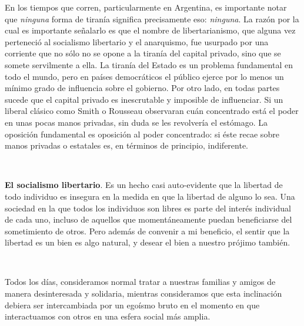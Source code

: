 \documentclass[a4paper, 12pt]{article}
\begin{document}
En los tiempos que corren, particularmente en Argentina, es importante notar que
\textit{ninguna} forma de tiranía significa precisamente eso: \textit{ninguna}.
La razón por la cual es importante señalarlo es que el nombre de
libertarianismo, que alguna vez perteneció al socialismo libertario y el
anarquismo, fue usurpado por una corriente que no sólo no se opone a la tiranía
del capital privado, sino que se somete servilmente a ella. La tiranía del
Estado es un problema fundamental en todo el mundo, pero en países democráticos
el público ejerce por lo menos un mínimo grado de influencia sobre el gobierno.
Por otro lado, en todas partes sucede que el capital privado es inescrutable y
imposible de influenciar. Si un liberal clásico como Smith o Rousseau observaran
cuán concentrado está el poder en unas pocas manos privadas, sin duda se les
revolvería el estómago. La oposición fundamental es oposición al poder
concentrado: si éste recae sobre manos privadas o estatales es, en términos de
principio, indiferente.


~

\textbf{El socialismo libertario}. Es un hecho casi auto-evidente que la
libertad de todo individuo es insegura en la medida en que la libertad de alguno
lo sea. Una sociedad en la que todos los individuos son libres es parte del
interés individual de cada uno, incluso de aquellos que momentáneamente puedan
beneficiarse del sometimiento de otros. Pero además de convenir a mi beneficio,
el sentir que la libertad es un bien es algo natural, y desear el bien a nuestro
prójimo también. 

~

Todos los días, consideramos normal tratar a nuestras familias y amigos de
manera desinteresada y solidaria, mientras consideramos que esta inclinación
debiera ser intercambiada por un egoísmo bruto en el momento en que
interactuamos con otros en una esfera social más amplia. 
\end{document}
